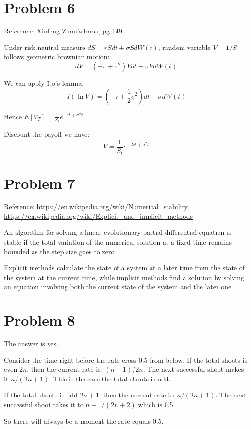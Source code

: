 \documentclass[12pt]{amsart}
\begin{document}
\section{Problem 6}
Reference: Xinfeng Zhou's book, pg 149

Under risk neutral measure $dS = rSdt + \sigma S dW(t)$, random variable $V=1/S$ follows geometric brownian motion:
\[
dV = (-r + \sigma^2)V dt - \sigma V dW(t)
\]

We can apply Ito's lemma:
\[
d(\ln V)=(-r +\frac{1}{2}\sigma^2)dt - \sigma dW(t)
\]

Hence $E[V_T]=\frac{1}{S_t}e^{-rt+\sigma^2 t}$.

Discount the payoff we have:
\[
V = \frac{1}{S_t}e^{-2 rt +\sigma^2 t}
\]





\section{Problem 7}
Reference: \url{https://en.wikipedia.org/wiki/Numerical_stability}
\newline
\url{https://en.wikipedia.org/wiki/Explicit_and_implicit_methods}
\newline

An algorithm for solving a linear evolutionary partial differential equation is stable if the total variation of the numerical solution at a fixed time remains bounded as the step size goes to zero

Explicit methods calculate the state of a system at a later time from the state of the system at the current time, while implicit methods find a solution by solving an equation involving both the current state of the system and the later one
\section{Problem 8}

The answer is yes.

Consider the time right before the rate cross 0.5 from below.
If the total shoots is even $2n$, then the current rate is: $(n-1)/2n$. The next successful shoot makes it $n/(2n+1)$. This is the case the total shoots is odd.

If the total shoots is odd $2n+1$, then the current rate is: $n/(2n+1)$. The next successful shoot takes it to $n+1/(2n+2)$ which is 0.5.

So there will always be a moment the rate equals 0.5.
\end{document}
